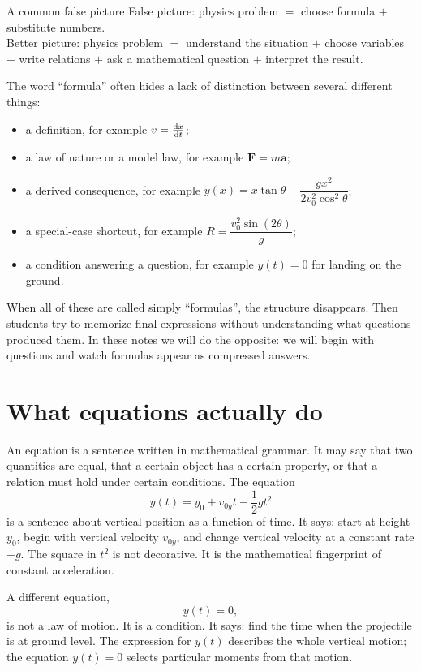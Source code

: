 \documentclass[11pt,a4paper]{article}
\newcommand{\vect}[1]{\boldsymbol{#1}}
\begin{document}
\begin{warningbox}{A common false picture}
False picture: physics problem $=$ choose formula $+$ substitute numbers.\\
Better picture: physics problem $=$ understand the situation $+$ choose variables $+$ write relations $+$ ask a mathematical question $+$ interpret the result.
\end{warningbox}

The word ``formula'' often hides a lack of distinction between several different things:
\begin{itemize}
    \item a definition, for example $v=\dv{x}{t}$;
    \item a law of nature or a model law, for example $\vect F=m\vect a$;
    \item a derived consequence, for example $y(x)=x\tan\theta-\dfrac{g x^2}{2v_0^2\cos^2\theta}$;
    \item a special-case shortcut, for example $R=\dfrac{v_0^2\sin(2\theta)}{g}$;
    \item a condition answering a question, for example $y(t)=0$ for landing on the ground.
\end{itemize}

When all of these are called simply ``formulas'', the structure disappears. Then students try to memorize final expressions without understanding what questions produced them. In these notes we will do the opposite: we will begin with questions and watch formulas appear as compressed answers.

\section{What equations actually do}

An equation is a sentence written in mathematical grammar. It may say that two quantities are equal, that a certain object has a certain property, or that a relation must hold under certain conditions. The equation
\[
y(t)=y_0+v_{0y}t-\frac{1}{2}gt^2
\]
is a sentence about vertical position as a function of time. It says: start at height $y_0$, begin with vertical velocity $v_{0y}$, and change vertical velocity at a constant rate $-g$. The square in $t^2$ is not decorative. It is the mathematical fingerprint of constant acceleration.

A different equation,
\[
y(t)=0,
\]
is not a law of motion. It is a condition. It says: find the time when the projectile is at ground level. The expression for $y(t)$ describes the whole vertical motion; the equation $y(t)=0$ selects particular moments from that motion.
\end{document}
